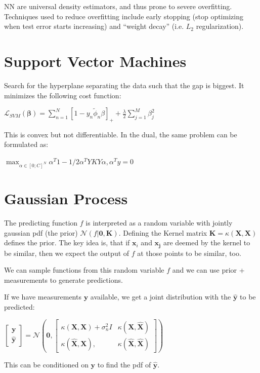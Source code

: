 \documentclass[10pt,a4paper,landscape]{article}
\providecommand{\bf}[1]{\ensuremath{\mathbf{#1}}}
\begin{document}
\begin{multicols*}{4}
NN are universal density estimators, and thus prone to severe overfitting. Techniques used to reduce overfitting include early stopping (stop optimizing when test error starts increasing) and ``weight decay'' (i.e. $L_2$ regularization).

\section{Support Vector Machines}
Search for the hyperplane separating the data such that the gap is biggest.
It minimizes the following cost function:

$\mathcal{L}_{SVM} (\bf{\beta})= \sum_{n=1}^N [1 - y_n \tilde\phi_n \beta]_{+} + \frac{\lambda}{2} \sum_{j=1}^M \beta_j^2$

This is convex but not differentiable. In the dual, the same problem can be formulated as:

$\max_{\alpha \in [0; C]^N} \alpha^T 1 - 1/2 \alpha^T Y K Y \alpha , \alpha^T y = 0$

\section{Gaussian Process}
The predicting function $f$ is interpreted as a random variable with jointly gaussian pdf (the prior) $\mathcal{N}(f | \bf{0}, \bf{K})$.
Defining the Kernel matrix $\bf{K} = \kappa(\bf{X}, \bf{X})$ defines the prior. The key idea is, that if $\bf{x}_i$ and $\bf{x_j}$ are
deemed by the kernel to be similar, then we expect the output of $f$ at those points to be similar, too.

We can sample functions from this random variable $f$ and we can use prior + measurements to generate predictions.

If we have measurements $\bf{y}$ available, we get a joint distribution with the $\bf{\hat{y}}$ to be predicted:

$
\begin{bmatrix}
  \bf{y} \\
  \bf{\hat{y}}
\end{bmatrix}
=
\mathcal{N} \left(
  \bf{0},
  \begin{bmatrix}
    \kappa(\bf{X}, \bf{X}) + \sigma_n^2 I  & \kappa(\bf{X}, \bf{\hat{X}}) \\
    \kappa(\bf{\hat{X}}, \bf{X}),          & \kappa(\bf{\hat{X}}, \bf{\hat{X}})
  \end{bmatrix}
\right)
$

This can be conditioned on $\bf{y}$ to find the pdf of $\bf{\hat{y}}$.


\end{multicols*}
\end{document}
